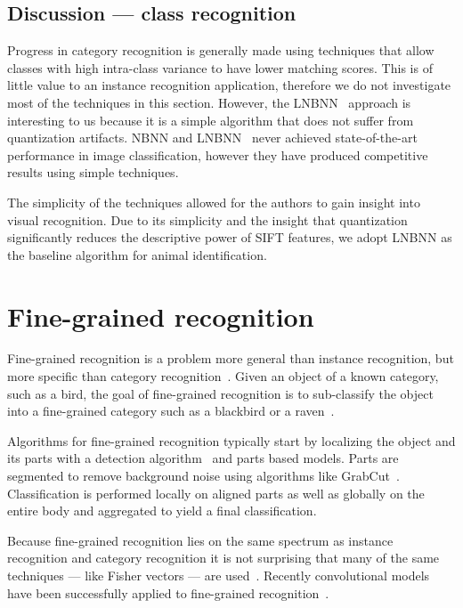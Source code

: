     \subsection{Discussion --- class recognition}

        Progress in category recognition is generally made using techniques that allow classes with high
        intra-class variance to have lower matching scores. This is of little value to an instance recognition
        application, therefore we do not investigate most of the techniques in this section. However, the
        LNBNN~\cite{mccann_local_2012} approach is interesting to us because it is a simple algorithm that does not
        suffer from quantization artifacts. NBNN and LNBNN~\cite{boiman_defense_2008,mccann_local_2012} never
        achieved state-of-the-art performance in image classification, however they have produced competitive
        results using simple techniques.

        The simplicity of the techniques allowed for the authors to gain insight into visual recognition. Due to
        its simplicity and the insight that quantization significantly reduces the descriptive power of SIFT
        features, we adopt LNBNN as the baseline algorithm for animal identification.


\section{Fine-grained recognition}\label{sec:fgr}  

    Fine-grained recognition is a problem more general than instance recognition, but more specific than category
    recognition~\cite{parkhi_cats_2012, berg_poof_2013, gavves_local_2014}. Given an object of a known category,
    such as a bird, the goal of fine-grained recognition is to sub-classify the object into a fine-grained category
    such as a blackbird or a raven~\cite{berg_how_2013}.

    Algorithms for fine-grained recognition typically start by localizing the object and its parts with a detection
    algorithm~\cite{dalal_histograms_2005} and parts based models. Parts are segmented to remove background noise
    using algorithms like GrabCut~\cite{rother_grabcut_2004}. Classification is performed locally on aligned parts
    as well as globally on the entire body and aggregated to yield a final classification.

    Because fine-grained recognition lies on the same spectrum as instance recognition and category recognition it
    is not surprising that many of the same techniques --- like Fisher vectors --- are
    used~\cite{gosselin_revisiting_2014}.
    Recently convolutional models have been successfully applied to fine-grained
    recognition~\cite{catherine_wah_similarity_2014, branson_bird_2014, zongyuan_ge_modelling_2015,
    zhang_weakly_2015, xiao_application_2015}.

